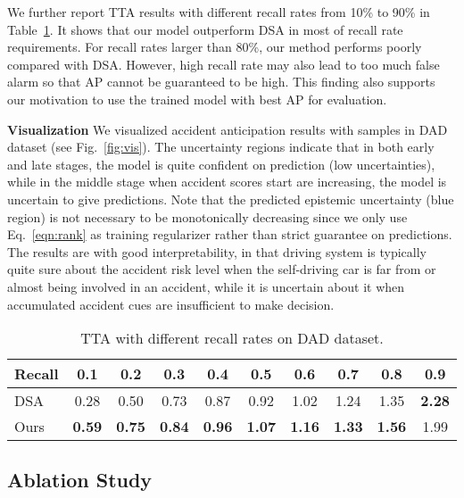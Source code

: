 \documentclass[sigconf]{acmart}
\begin{document}
We further report TTA results with different recall rates from 10\% to 90\% in Table~\ref{tab:ttar}. It shows that our model outperform DSA in most of recall rate requirements. For recall rates larger than 80\%, our method performs poorly compared with DSA. However, high recall rate may also lead to too much false alarm so that AP cannot be guaranteed to be high. This finding also supports our motivation to use the trained model with best AP for evaluation.

\textbf{Visualization} We visualized accident anticipation results with samples in DAD dataset (see Fig.~\ref{fig:vis}). The uncertainty regions indicate that in both early and late stages, the model is quite confident on prediction (low uncertainties), while in the middle stage when accident scores start are increasing, the model is uncertain to give predictions. Note that the predicted epistemic uncertainty (blue region) is not necessary to be monotonically decreasing since we only use Eq.~\ref{eqn:rank} as training regularizer rather than strict guarantee on predictions. The results are with good interpretability, in that driving system is typically quite sure about the accident risk level when the self-driving car is far from or almost being involved in an accident, while it is uncertain about it when accumulated accident cues are insufficient to make decision.

\begin{table}[t]
\centering
\caption{TTA with different recall rates on DAD dataset.}
\setlength{\tabcolsep}{1.0mm}
\label{tab:ttar}
\normalsize
\begin{tabular}{l|ccccccccc}
\hline
Recall &0.1 &0.2 &0.3 &0.4 &0.5 &0.6 &0.7 &0.8 &0.9 \\
\hline
DSA~\cite{ChanACCV2016} &0.28 &0.50 &0.73 &0.87 &0.92 &1.02 &1.24 &1.35 &\textbf{2.28} \\
Ours &\textbf{0.59} &\textbf{0.75} &\textbf{0.84} &\textbf{0.96} &\textbf{1.07} &\textbf{1.16} &\textbf{1.33} &\textbf{1.56} &1.99 \\
\hline
\end{tabular}
\end{table}


\subsection{Ablation Study}
\end{document}
